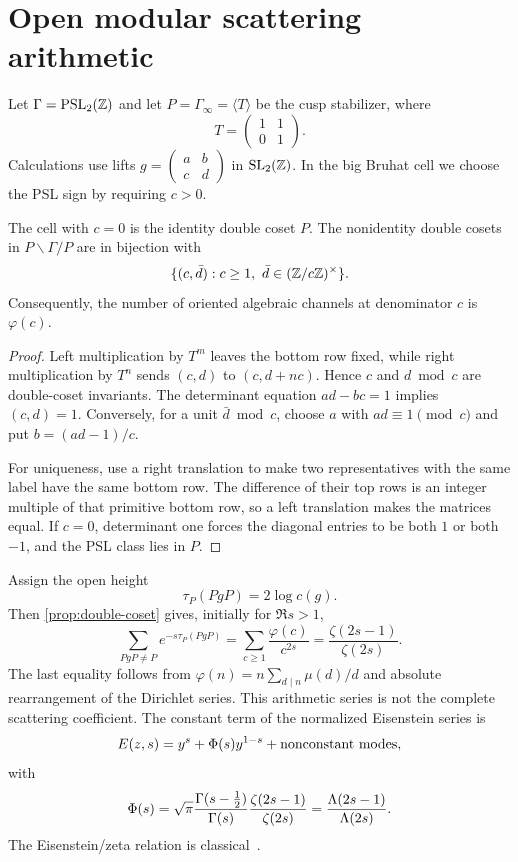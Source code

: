 \section{Open modular scattering arithmetic}

Let $\Gamma=\operatorname{PSL}_2(\mathbb Z)$ and let $P=\Gamma_\infty=\langle T\rangle$ be the
cusp stabilizer, where
\[
 T=\begin{pmatrix}1&1\\0&1\end{pmatrix}.
\]
Calculations use lifts
$g=\left(\begin{smallmatrix}a&b\\c&d\end{smallmatrix}\right)$ in
$\operatorname{SL}_2(\mathbb Z)$.  In the big Bruhat cell we choose the PSL sign by requiring
$c>0$.

\begin{proposition}\label{prop:double-coset}
The cell with $c=0$ is the identity double coset $P$.  The nonidentity double
cosets in $P\backslash\Gamma/P$ are in bijection with
\[
 \{(c,\bar d):c\geq1,\ \bar d\in(\Z/c\Z)^\times\}.
\]
Consequently, the number of oriented algebraic channels at denominator $c$
is $\varphi(c)$.
\end{proposition}

\begin{proof}
Left multiplication by $T^m$ leaves the bottom row fixed, while right
multiplication by $T^n$ sends $(c,d)$ to $(c,d+nc)$.  Hence $c$ and
$d\bmod c$ are double-coset invariants.  The determinant equation
$ad-bc=1$ implies $(c,d)=1$.  Conversely, for a unit $\bar d\bmod c$, choose
$a$ with $ad\equiv1\pmod c$ and put $b=(ad-1)/c$.

For uniqueness, use a right translation to make two representatives with the
same label have the same bottom row.  The difference of their top rows is an
integer multiple of that primitive bottom row, so a left translation makes
the matrices equal.  If $c=0$, determinant one forces the diagonal entries to
be both $1$ or both $-1$, and the PSL class lies in $P$.
\end{proof}

Assign the open height
\[
 \tau_P(PgP)=2\log c(g).
\]
Then \cref{prop:double-coset} gives, initially for $\Re s>1$,
\begin{equation}\label{eq:totient-dirichlet}
 \sum_{PgP\ne P}e^{-s\tau_P(PgP)}
 =\sum_{c\geq1}\frac{\varphi(c)}{c^{2s}}
 =\frac{\zeta(2s-1)}{\zeta(2s)}.
\end{equation}
The last equality follows from
$\varphi(n)=n\sum_{d\mid n}\mu(d)/d$ and absolute rearrangement of the
Dirichlet series.  This arithmetic series is not the complete scattering
coefficient.  The constant term of the normalized Eisenstein series is
\[
 E(z,s)=y^s+\Phi(s)y^{1-s}+\text{nonconstant modes},
\]
with
\begin{equation}\label{eq:scattering}
 \Phi(s)=\sqrt\pi\frac{\Gamma(s-\tfrac12)}{\Gamma(s)}
 \frac{\zeta(2s-1)}{\zeta(2s)}
 =\frac{\Lambda(2s-1)}{\Lambda(2s)}.
\end{equation}
The Eisenstein/zeta relation is classical~\cite{Zagier1981}.

